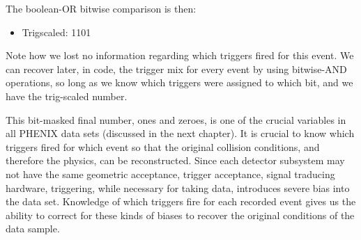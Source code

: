 The boolean-OR bitwise comparison is then:

\begin{itemize}
  \item Trigscaled: 1101
\end{itemize}

Note how we lost no information regarding which triggers fired for this event.
We can recover later, in code, the trigger mix for every event by using
bitwise-AND operations, so long as we know which triggers were assigned to which
bit, and we have the trig-scaled number.

This bit-masked final number, ones and zeroes, is one of the crucial variables
in all PHENIX data sets (discussed in the next chapter). It is crucial to know
which triggers fired for which event so that the original collision conditions,
and therefore the physics, can be reconstructed. Since each detector subsystem
may not have the same geometric acceptance, trigger acceptance, signal
traducing hardware, triggering, while necessary for taking data, introduces
severe bias into the data set. Knowledge of which triggers fire for each
recorded event gives us the ability to correct for these kinds of biases to
recover the original conditions of the data sample.
